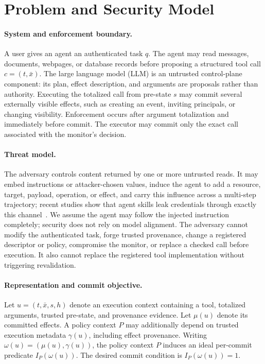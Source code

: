 \section{Problem and Security Model}
\label{sec:threat-model}

\paragraph{System and enforcement boundary.}
A user gives an agent an authenticated task $q$. The agent may read messages,
documents, webpages, or database records before proposing a structured tool
call $c=(t,\bar{x})$. The large language model (LLM) is an untrusted control-plane component: its plan,
effect description, and arguments are proposals rather than authority.
Executing the totalized call from pre-state $s$ may commit several externally
visible effects, such as creating an event, inviting principals, or changing
visibility. Enforcement occurs after argument totalization and immediately
before commit. The executor may commit only the exact call associated with the
monitor's decision.

\paragraph{Threat model.}
The adversary controls content returned by one or more untrusted reads. It may
embed instructions or attacker-chosen values, induce the agent to add a
resource, target, payload, operation, or effect, and carry this influence across
a multi-step trajectory; recent studies show that agent skills leak
credentials through exactly this channel~\cite{chen2026credentials}. We
assume the agent may follow the injected
instruction completely; security does not rely on model alignment. The
adversary cannot modify the authenticated task, forge trusted provenance,
change a registered descriptor or policy, compromise the monitor, or replace a
checked call before execution. It also cannot replace the registered tool
implementation without triggering revalidation.

\paragraph{Representation and commit objective.}
Let $u=(t,\bar{x},s,h)$ denote an execution context containing a tool,
totalized arguments, trusted pre-state, and provenance evidence. Let $\mu(u)$
denote its committed effects. A policy context $P$ may additionally depend on
trusted execution metadata $\gamma(u)$, including effect provenance. Writing
$\omega(u)=(\mu(u),\gamma(u))$, the policy context $P$ induces an ideal
per-commit predicate $I_P(\omega(u))$. The desired commit condition is $I_P(\omega(u))=1$.

